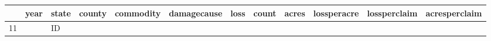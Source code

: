 \documentclass[]{article}
\begin{document}
\begin{longtable}[]{@{}lrllllrrrrrr@{}}
\toprule
\begin{minipage}[b]{0.02\columnwidth}\raggedright
\strut
\end{minipage} & \begin{minipage}[b]{0.03\columnwidth}\raggedleft
year\strut
\end{minipage} & \begin{minipage}[b]{0.03\columnwidth}\raggedright
state\strut
\end{minipage} & \begin{minipage}[b]{0.06\columnwidth}\raggedright
county\strut
\end{minipage} & \begin{minipage}[b]{0.09\columnwidth}\raggedright
commodity\strut
\end{minipage} & \begin{minipage}[b]{0.12\columnwidth}\raggedright
damagecause\strut
\end{minipage} & \begin{minipage}[b]{0.03\columnwidth}\raggedleft
loss\strut
\end{minipage} & \begin{minipage}[b]{0.03\columnwidth}\raggedleft
count\strut
\end{minipage} & \begin{minipage}[b]{0.03\columnwidth}\raggedleft
acres\strut
\end{minipage} & \begin{minipage}[b]{0.07\columnwidth}\raggedleft
lossperacre\strut
\end{minipage} & \begin{minipage}[b]{0.08\columnwidth}\raggedleft
lossperclaim\strut
\end{minipage} & \begin{minipage}[b]{0.08\columnwidth}\raggedleft
acresperclaim\strut
\end{minipage}\tabularnewline
\midrule
\endhead
\begin{minipage}[t]{0.02\columnwidth}\raggedright
11\strut
\end{minipage} & \begin{minipage}[t]{0.03\columnwidth}\raggedleft
2014\strut
\end{minipage} & \begin{minipage}[t]{0.03\columnwidth}\raggedright
ID\strut
\end{minipage} & \begin{minipage}[t]{0.06\columnwidth}\raggedright

\end{minipage}
\end{longtable}
\end{document}
